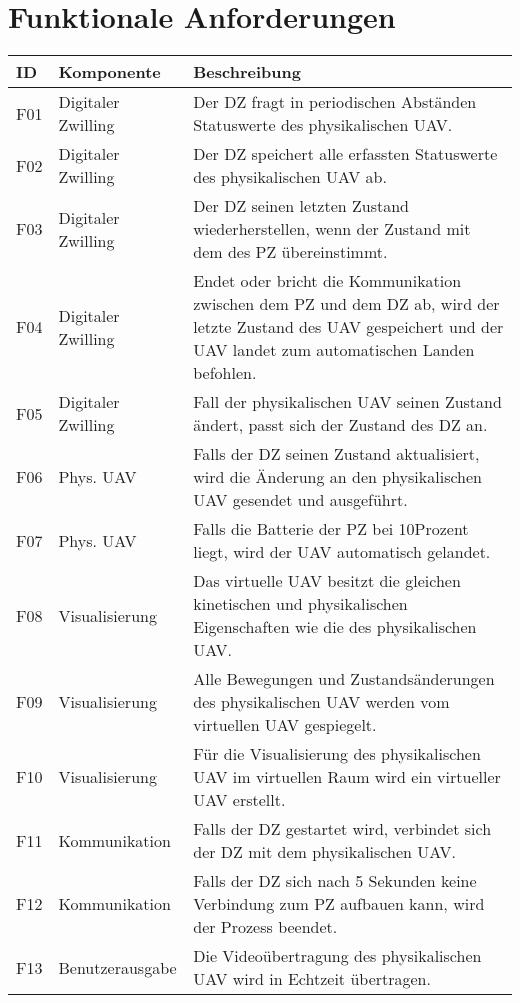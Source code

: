 \section{Funktionale Anforderungen}

\renewcommand{\arraystretch}{1.4}
\begin{table}[H]
\begin{tabular}{ p{0.5cm} p{3cm} p{11cm}}
    ID & Komponente & Beschreibung  \\
    \hline
    F01 & Digitaler Zwilling & Der DZ fragt in periodischen Abständen Statuswerte des physikalischen UAV. \\
    F02 & Digitaler Zwilling & Der DZ speichert alle erfassten Statuswerte des physikalischen UAV ab. \\
    F03 & Digitaler Zwilling & Der DZ seinen letzten Zustand wiederherstellen, wenn der Zustand mit dem des PZ übereinstimmt. \\
    F04 & Digitaler Zwilling & Endet oder bricht die Kommunikation zwischen dem PZ und dem DZ ab, wird der letzte Zustand des UAV gespeichert und der UAV landet zum automatischen Landen befohlen. \\
    F05 & Digitaler Zwilling & Fall der physikalischen UAV seinen Zustand ändert, passt sich der Zustand des DZ an. \\
    F06 & Phys. UAV & Falls der DZ seinen Zustand aktualisiert, wird die Änderung an den physikalischen UAV gesendet und ausgeführt. \\
    F07 & Phys. UAV & Falls die Batterie der PZ bei 10Prozent liegt, wird der UAV automatisch gelandet. \\
    F08 & Visualisierung & Das virtuelle UAV besitzt die gleichen kinetischen und physikalischen Eigenschaften wie die des physikalischen UAV. \\
    F09 & Visualisierung & Alle Bewegungen und Zustandsänderungen des physikalischen UAV werden vom virtuellen UAV gespiegelt. \\
    F10 & Visualisierung & Für die Visualisierung des physikalischen UAV im virtuellen Raum wird ein virtueller UAV erstellt. \\
    F11 & Kommunikation & Falls der DZ gestartet wird, verbindet sich der DZ mit dem physikalischen UAV. \\
    F12 & Kommunikation & Falls der DZ sich nach 5 Sekunden keine Verbindung zum PZ aufbauen kann, wird der Prozess beendet. \\
    F13 & Benutzerausgabe & Die Videoübertragung des physikalischen UAV wird in Echtzeit übertragen. \\

\end{tabular}
\end{table}
